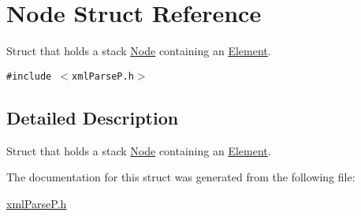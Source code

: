 \hypertarget{structNode}{
\section{Node Struct Reference}
\label{structNode}
}
Struct that holds a stack \hyperlink{structNode}{Node} containing an \hyperlink{structElement}{Element}.  


{\tt \#include $<$xmlParseP.h$>$}



\subsection{Detailed Description}
Struct that holds a stack \hyperlink{structNode}{Node} containing an \hyperlink{structElement}{Element}. 

The documentation for this struct was generated from the following file:\begin{CompactItemize}
\item 
\hyperlink{xmlParseP_8h}{xmlParseP.h}\end{CompactItemize}
